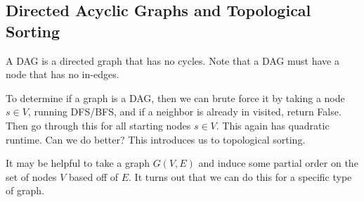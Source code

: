 \subsection{Directed Acyclic Graphs and Topological Sorting}

  \begin{definition}
    A DAG is a directed graph that has no cycles. Note that a DAG must have a node that has no in-edges. 
  \end{definition}

  To determine if a graph is a DAG, then we can brute force it by taking a node $s \in V$, running DFS/BFS, and if a neighbor is already in visited, return False. Then go through this for all starting nodes $s \in V$. This again has quadratic runtime. Can we do better? This introduces us to topological sorting. 

  It may be helpful to take a graph $G(V, E)$ and induce some partial order on the set of nodes $V$ based off of $E$. It turns out that we can do this for a specific type of graph. 
  
